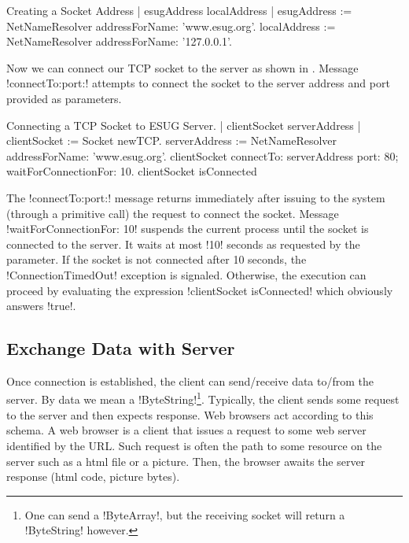 \documentclass[a4paper,10pt,twoside]{book}
\begin{document}

\begin{script}[creatingSocketAddress]{Creating a Socket Address}
| esugAddress localAddress |
esugAddress := NetNameResolver addressForName: 'www.esug.org'.
localAddress := NetNameResolver addressForName: '127.0.0.1'.
\end{script}

Now we can connect our TCP socket to the server as shown in .
Message \ct!connectTo:port:! attempts to connect the socket to the server  address and port  provided as parameters.
 

\begin{script}[connectingTcpSocket]{Connecting a TCP Socket to ESUG Server.}
| clientSocket serverAddress |
clientSocket := Socket newTCP.
serverAddress := NetNameResolver addressForName: 'www.esug.org'.
clientSocket 
	connectTo: serverAddress port: 80;
	waitForConnectionFor: 10.
clientSocket isConnected
\end{script}

The \ct!connectTo:port:!  message returns immediately after issuing to the system (through a primitive call) the request to connect the socket.
Message \ct!waitForConnectionFor: 10! suspends the current process until the socket is connected to the server.
It waits at most \ct!10! seconds as requested by the parameter.
If the socket is not connected after 10 seconds, the \ct!ConnectionTimedOut! exception is signaled. 
Otherwise, the execution can proceed by evaluating the expression \ct!clientSocket isConnected! which obviously answers \ct!true!.



\subsection{Exchange Data with Server}
\label{sec:exchangeData}
Once  connection is established, the client can send/receive data to/from the server.
By data we mean a \ct!ByteString!\footnote{One can send a \ct!ByteArray!, but the receiving socket will return a \ct!ByteString! however.}.
Typically, the client sends some request to the server and then expects  response.
Web browsers act according to this schema.
A web browser is a client that issues a request to some web server identified by the URL.
Such request is often the path to some resource on the server such as a html file or a picture.
Then, the browser awaits the server response (\eg html code, picture bytes).
\end{document}
